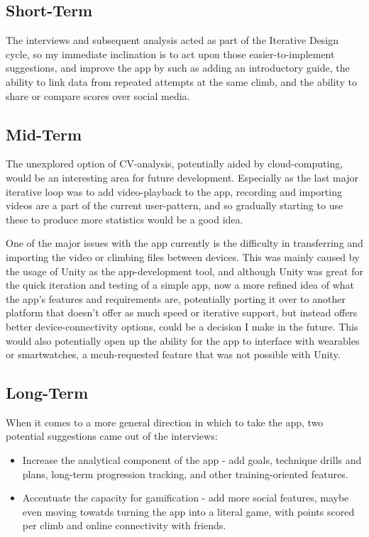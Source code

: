 \subsection{Short-Term}
The interviews and subsequent analysis acted as part of the Iterative Design cycle, so my immediate inclination is to act upon those easier-to-implement suggestions, and improve the app by such as adding an introductory guide, the ability to link data from repeated attempts at the same climb, and the ability to share or compare scores over social media.


\subsection{Mid-Term}
The unexplored option of CV-analysis, potentially aided by cloud-computing, would be an interesting area for future development.
Especially as the last major iterative loop was to add video-playback to the app, recording and importing videos are a part of the current user-pattern, and so gradually starting to use these to produce more statistics would be a good idea.

One of the major issues with the app currently is the difficulty in transferring and importing the video or climbing files between devices.
This was mainly caused by the usage of Unity as the app-development tool, and although Unity was great for the quick iteration and testing of a simple app, now a more refined idea of what the app's features and requirements are, potentially porting it over to another platform that doesn't offer as much speed or iterative support, but instead offers better device-connectivity options, could be a decision I make in the future.
This would also potentially open up the ability for the app to interface with wearables or smartwatches, a mcuh-requested feature that was not possible with Unity.


\subsection{Long-Term}
When it comes to a more general direction in which to take the app, two potential suggestions came out of the interviews:
\begin{itemize}
    \item Increase the analytical component of the app - add goals, technique drills and plans, long-term progression tracking, and other training-oriented features.
    \item Accentuate the capacity for gamification - add more social features, maybe even moving towatds turning the app into a literal game, with points scored per climb and online connectivity with friends.
\end{itemize}




